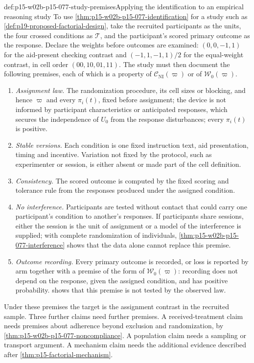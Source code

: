 \begin{hbmethod}{def:p15-w02b-p15-077-study-premises}{Applying the identification to an empirical reasoning study}
To use \cref{thm:p15-w02b-p15-077-identification} for a study such as
\cref{def:p19-proposed-factorial-design}, take the recruited participants
as the units, the four crossed conditions as \(\mathcal T\), and the
participant's scored primary outcome as the response. Declare the weights
before outcomes are examined: \((0,0,-1,1)\) for the aid-present checking
contrast and \((-1,1,-1,1)/2\) for the equal-weight contrast, in cell order
\((00,10,01,11)\). The study must then document the following premises,
each of which is a property of \(\mathcal C_{\mathrm{NI}}(\varpi)\) or of
\(\mathcal W_0(\varpi)\).
\begin{enumerate}
\item \emph{Assignment law.} The randomization procedure, its cell sizes
      or blocking, and hence \(\varpi\) and every \(\pi_i(t)\), fixed
      before assignment; the device is not informed by participant
      characteristics or anticipated responses, which secures the
      independence of \(U_0\) from the response disturbances; every
      \(\pi_i(t)\) is positive.
\item \emph{Stable versions.} Each condition is one fixed instruction text,
      aid presentation, timing and incentive. Variation not fixed by the
      protocol, such as experimenter or session, is either absent or made
      part of the cell definition.
\item \emph{Consistency.} The scored outcome is computed by the fixed
      scoring and tolerance rule from the responses produced under the
      assigned condition.
\item \emph{No interference.} Participants are tested without contact
      that could carry one participant's condition to another's responses.
      If participants share sessions, either the session is the unit of
      assignment or a model of the interference is supplied; with
      complete randomization of individuals,
      \cref{thm:p15-w02b-p15-077-interference} shows that the data alone
      cannot replace this premise.
\item \emph{Outcome recording.} Every primary outcome is recorded, or loss
      is reported by arm together with a premise of the form of
      \(\mathcal W_0(\varpi)\): recording does not depend on the
      response, given the assigned condition, and has positive probability.
       shows that this premise is
      not tested by the observed law.
\end{enumerate}
Under these premises the target is the assignment contrast in the recruited
sample. Three further claims need further premises. A received-treatment
claim needs premises about adherence beyond exclusion and randomization,
by \cref{thm:p15-w02b-p15-077-noncompliance}. A population claim needs a
sampling or transport argument. A mechanism claim needs the additional
evidence described after \cref{thm:p15-factorial-mechanism}.
\end{hbmethod}

